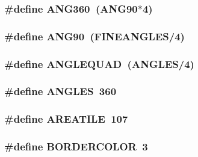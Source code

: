 \label{WL__DEF_8H_a3c1e7faea96e870ade747ba6af50e3f8}
\hypertarget{WL__DEF_8H_a6b34308ddc4ece5a722d1f011d2f7255}{
\subsubsection[{ANG360}]{\setlength{\rightskip}{0pt plus 5cm}\#define ANG360~(ANG90$\ast$4)}}
\label{WL__DEF_8H_a6b34308ddc4ece5a722d1f011d2f7255}
\hypertarget{WL__DEF_8H_a8300a35b0193fbca6e7b9bf85f99dac5}{
\subsubsection[{ANG90}]{\setlength{\rightskip}{0pt plus 5cm}\#define ANG90~(FINEANGLES/4)}}
\label{WL__DEF_8H_a8300a35b0193fbca6e7b9bf85f99dac5}
\hypertarget{WL__DEF_8H_a09f736f092265004f3fb2bf648db8687}{
\subsubsection[{ANGLEQUAD}]{\setlength{\rightskip}{0pt plus 5cm}\#define ANGLEQUAD~(ANGLES/4)}}
\label{WL__DEF_8H_a09f736f092265004f3fb2bf648db8687}
\hypertarget{WL__DEF_8H_a0340fae0459def110b731df3291e7e68}{
\subsubsection[{ANGLES}]{\setlength{\rightskip}{0pt plus 5cm}\#define ANGLES~360}}
\label{WL__DEF_8H_a0340fae0459def110b731df3291e7e68}
\hypertarget{WL__DEF_8H_af1317821adcca4131d0673f439ccff16}{
\subsubsection[{AREATILE}]{\setlength{\rightskip}{0pt plus 5cm}\#define AREATILE~107}}
\label{WL__DEF_8H_af1317821adcca4131d0673f439ccff16}
\hypertarget{WL__DEF_8H_a22eab88aba99b04969b4074b344670b6}{
\subsubsection[{BORDERCOLOR}]{\setlength{\rightskip}{0pt plus 5cm}\#define BORDERCOLOR~3}}
